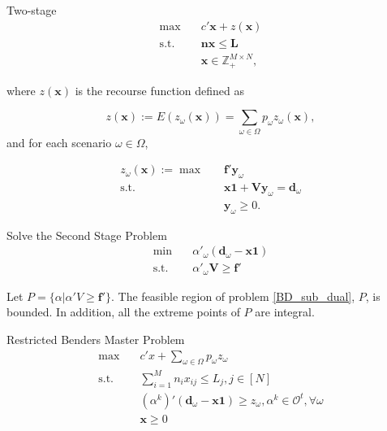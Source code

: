 \begin{frame}{Two-stage}
  \begin{equation}\label{BD_master}
    \begin{aligned}
  \max \quad & c{'} \mathbf{x}+ z(\mathbf{x}) \\
  \text {s.t.} \quad & \mathbf{n} \mathbf{x} \leq \mathbf{L} \\
  & \mathbf{x} \in \mathbb{Z}_{+}^{M \times N},
  \end{aligned}
  \end{equation}

  where $z(\mathbf{x})$ is the recourse function defined as 

$$z(\mathbf{x}) := E(z_{\omega}(\mathbf{x})) = \sum_{\omega \in \Omega} p_{\omega} z_{\omega}(\mathbf{x}),$$ and for each scenario $\omega \in \Omega$, 

  \begin{equation}\label{BD_sub}
    \begin{aligned}
      z_{\omega}(\mathbf{x}) := \max \quad & \mathbf{f}{'} \mathbf{y}_{\omega} \\
      \text {s.t.} \quad & \mathbf{x} \mathbf{1} + \mathbf{V} \mathbf{y}_{\omega} = \mathbf{d}_{\omega} \\
       & \mathbf{y}_{\omega} \geq 0.
    \end{aligned}
    \end{equation}
\end{frame}

\begin{frame}{Solve the Second Stage Problem}
  \begin{equation}\label{BD_sub_dual}
    \begin{aligned}
      \min \quad & \alpha{'}_{\omega} (\mathbf{d}_{\omega}- \mathbf{x} \mathbf{1}) \\
      \text {s.t.} \quad & \alpha{'}_{\omega} \mathbf{V} \geq \mathbf{f}{'}
    \end{aligned}
    \end{equation}

    Let $P = \{\alpha|\alpha{'}V \geq \mathbf{f}{'}\}$. 
    The feasible region of problem \eqref{BD_sub_dual}, $P$, is bounded. In addition, all the extreme points of $P$ are integral.
\end{frame}

\begin{frame}{Restricted Benders Master Problem}
  \begin{equation}\label{BD_master2}
    \begin{aligned}
      \max \quad & c{'} x + \sum_{\omega \in \Omega} p_{\omega} z_{\omega} \\
      \text {s.t.} \quad & \sum_{i=1}^{M} n_{i} x_{ij} \leq L_j, j \in [N] \\
      & (\alpha^{k}){'}(\mathbf{d}_{\omega}- \mathbf{x} \mathbf{1}) \geq z_{\omega}, \alpha^k \in \mathcal{O}^{t}, \forall \omega \\
       & \mathbf{x} \geq 0
    \end{aligned}
  \end{equation}  
\end{frame}
